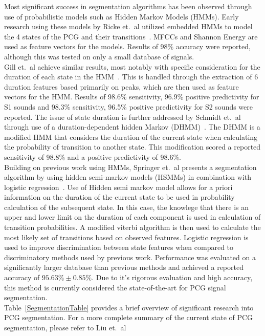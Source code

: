 \documentclass[titlepage, 12pt]{scrartcl} \usepackage{enumitem}
\begin{document}
Most significant success in segmentation algorithms has been observed through use
of probabilistic models such as Hidden Markov Models (HMMs). Early research
using these models by Ricke et.\ al utilized embedded HMMs to model the 4
states of the PCG and their transitions~\citeyearpar{Ricke2005}. MFCCs and
Shannon Energy are used as feature vectors for the models. Results of
98\% accuracy were reported, although this was tested on only a small database
of signals.\\
Gill et.\ al achieve similar results, most notably with specific consideration
for the duration of each state in the HMM~\citeyearpar{Gill2005}. This is
handled through the extraction of 6 duration features based primarily on peaks,
which are then used as feature vectors for the HMM. Results of 98.6\%
sensitivity, 96.9\% positive predictivity for S1 sounds and 98.3\% sensitivity,
96.5\% positive predictivity for S2 sounds were reported.
The issue of state duration is further addressed by Schmidt et.\ al through use
of a duration-dependent hidden Markov (DHMM)~\citeyearpar{Schmidt2015}. The
DHMM is a modified HMM that considers the duration of the current state when
calculating the probability of transition to another state. This modification
scored a reported sensitivity of 98.8\% and a positive predictivity of
98.6\%.\\
Building on previous work using HMMs, Springer et.\ al presents a segmentation
algorithm by using hidden semi-markov models (HSMMs) in combination with
logistic regression~\citeyearpar{Springer2016}. Use of Hidden semi markov model
allows for a priori information on the duration of the current state to be used
in probability calculation of the subsequent state. In this case, the knowlege
that there is an upper and lower limit on the duration of each component is
used in calculation of transition probabilities.  A modified viterbi algorithm
is then used to calculate the most likely set of transitions based on observed
features. Logistic regression is used to improve discrimination between state
features when compared to discriminatory methods used by previous work.
Performance was evaluated on a significantly larger database than previous
methods and achieved a reported accuracy of $95.63\% \pm 0.85\%$. Due to it's
rigorous evaluation and high accuracy, this method is currently considered the
state-of-the-art for PCG signal segmentation.\\

Table~\ref{SegmentationTable} provides a brief overview of significant research
into PCG segmentation. For a more complete summary of the current state of PCG
segmentation, please refer to Liu et.\ al~\citeyearpar{Liu2016}
\end{document}
